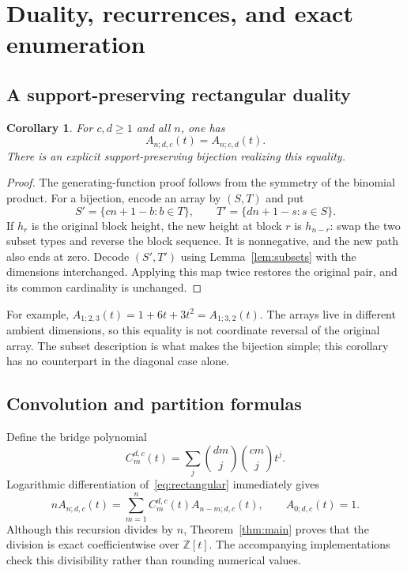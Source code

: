 \documentclass[11pt]{article}
\numberwithin{equation}{section}
\newtheorem{corollary}[theorem]{Corollary}
\theoremstyle{definition}
\newcommand{\Z}{\mathbb Z}
\newcommand{\Adc}[1]{A_{#1;d,c}}
\begin{document}
\section{Duality, recurrences, and exact enumeration}
\label{sec:enumeration}

\subsection{A support-preserving rectangular duality}
\begin{corollary}
\label{cor:duality}
For $c,d\geq1$ and all $n$, one has
\begin{equation}
 A_{n;d,c}(t)=A_{n;c,d}(t).\label{eq:duality}
\end{equation}
There is an explicit support-preserving bijection realizing this equality.
\end{corollary}
\begin{proof}
The generating-function proof follows from the symmetry of the binomial
product. For a bijection, encode an array by $(S,T)$ and put
\[
 S'=\{cn+1-b:b\in T\},\qquad
 T'=\{dn+1-s:s\in S\}.
\]
If $h_r$ is the original block height, the new height at block $r$ is
$h_{n-r}$: swap the two subset types and reverse the block sequence.
It is nonnegative, and the new path also ends at zero. Decode $(S',T')$
using Lemma~\ref{lem:subsets} with the dimensions interchanged. Applying this
map twice restores the original pair, and its common cardinality is unchanged.
\end{proof}

For example, $A_{1;2,3}(t)=1+6t+3t^2=A_{1;3,2}(t)$. The arrays live in
different ambient dimensions, so this equality is not coordinate reversal of
the original array. The subset description is what makes the bijection simple;
this corollary has no counterpart in the diagonal case alone.

\subsection{Convolution and partition formulas}
Define the bridge polynomial
\begin{equation}
 C_m^{d,c}(t)=\sum_j\binom{dm}{j}\binom{cm}{j}t^j.
 \label{eq:C}
\end{equation}
Logarithmic differentiation of~\eqref{eq:rectangular} immediately gives
\begin{equation}
 \boxed{n\Adc n(t)=\sum_{m=1}^n C_m^{d,c}(t)\Adc{n-m}(t),
        \qquad \Adc0(t)=1.}\label{eq:recurrence}
\end{equation}
Although this recursion divides by $n$, Theorem~\ref{thm:main} proves that
the division is exact coefficientwise over $\Z[t]$. The accompanying
implementations check this divisibility rather than rounding numerical values.
\end{document}
